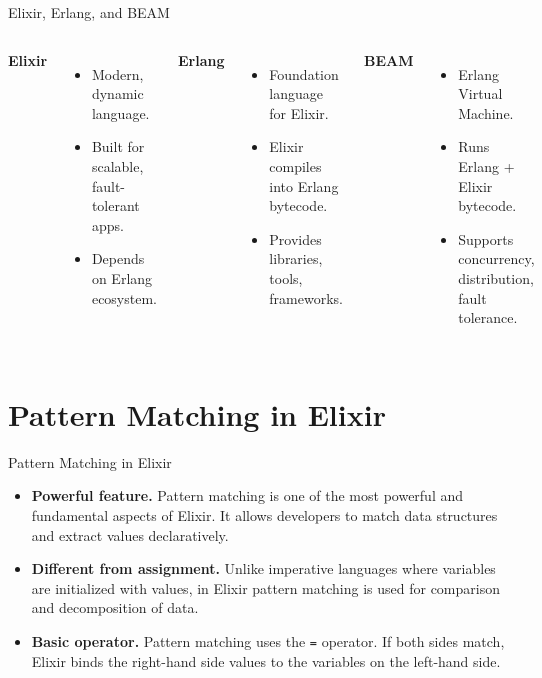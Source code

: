 \documentclass[aspectratio=169, table]{beamer}
\begin{document}
\begin{frame}{Elixir, Erlang, and BEAM}
\vspace{20pt}
\begin{columns}[t]
  \textbf{Elixir}  
  \begin{itemize}
    \item Modern, dynamic language.  
    \item Built for scalable, fault-tolerant apps.  
    \item Depends on Erlang ecosystem.  
  \end{itemize}

  \textbf{Erlang}  
  \begin{itemize}
    \item Foundation language for Elixir.  
    \item Elixir compiles into Erlang bytecode.  
    \item Provides libraries, tools, frameworks.  
  \end{itemize}

  \textbf{BEAM}  
  \begin{itemize}
    \item Erlang Virtual Machine.  
    \item Runs Erlang + Elixir bytecode.  
    \item Supports concurrency, distribution, fault tolerance.  
  \end{itemize}
\end{columns}
\end{frame}

\section{Pattern Matching in Elixir}
\begin{frame}{Pattern Matching in Elixir}
\vspace{20pt}
\begin{itemize}
  \item \textbf{Powerful feature.} Pattern matching is one of the most powerful and fundamental aspects of Elixir. It allows developers to match data structures and extract values declaratively.  
  \item \textbf{Different from assignment.} Unlike imperative languages where variables are initialized with values, in Elixir pattern matching is used for comparison and decomposition of data.  
  \item \textbf{Basic operator.} Pattern matching uses the \texttt{=} operator. If both sides match, Elixir binds the right-hand side values to the variables on the left-hand side.  
\end{itemize}
\end{frame}
\end{document}
